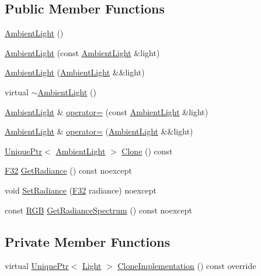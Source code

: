 \subsection*{Public Member Functions}
\begin{DoxyCompactItemize}
\item 
\hyperlink{classmage_1_1_ambient_light_a753dd42af4b6ad15b2f0867a99d6aabe}{Ambient\+Light} ()
\item 
\hyperlink{classmage_1_1_ambient_light_ac5295d1f90e64d3e59ff2856df32a187}{Ambient\+Light} (const \hyperlink{classmage_1_1_ambient_light}{Ambient\+Light} \&light)
\item 
\hyperlink{classmage_1_1_ambient_light_aab4919587032054d28ec15cf5639ad48}{Ambient\+Light} (\hyperlink{classmage_1_1_ambient_light}{Ambient\+Light} \&\&light)
\item 
virtual \hyperlink{classmage_1_1_ambient_light_a511bb794b11f112e750da09f4044e7db}{$\sim$\+Ambient\+Light} ()
\item 
\hyperlink{classmage_1_1_ambient_light}{Ambient\+Light} \& \hyperlink{classmage_1_1_ambient_light_aa8bbeaca08a626b6b5f5447a847724cc}{operator=} (const \hyperlink{classmage_1_1_ambient_light}{Ambient\+Light} \&light)
\item 
\hyperlink{classmage_1_1_ambient_light}{Ambient\+Light} \& \hyperlink{classmage_1_1_ambient_light_ae54bf8695957fb438e162a913725922a}{operator=} (\hyperlink{classmage_1_1_ambient_light}{Ambient\+Light} \&\&light)
\item 
\hyperlink{namespacemage_a3316d7143a973e37adf1110f2e80ca31}{Unique\+Ptr}$<$ \hyperlink{classmage_1_1_ambient_light}{Ambient\+Light} $>$ \hyperlink{classmage_1_1_ambient_light_a542a68882bc0807cf5f9a37391b9f44e}{Clone} () const
\item 
\hyperlink{namespacemage_aa97e833b45f06d60a0a9c4fc22ae02c0}{F32} \hyperlink{classmage_1_1_ambient_light_ab41f72d902f590ebc62ab58427e2bdab}{Get\+Radiance} () const noexcept
\item 
void \hyperlink{classmage_1_1_ambient_light_aac9a833f2261eaa1bf5eaab7608fc878}{Set\+Radiance} (\hyperlink{namespacemage_aa97e833b45f06d60a0a9c4fc22ae02c0}{F32} radiance) noexcept
\item 
const \hyperlink{structmage_1_1_r_g_b}{R\+GB} \hyperlink{classmage_1_1_ambient_light_a5d135eeeef619f13435341eebd3fe476}{Get\+Radiance\+Spectrum} () const noexcept
\end{DoxyCompactItemize}
\subsection*{Private Member Functions}
\begin{DoxyCompactItemize}
\item 
virtual \hyperlink{namespacemage_a3316d7143a973e37adf1110f2e80ca31}{Unique\+Ptr}$<$ \hyperlink{classmage_1_1_light}{Light} $>$ \hyperlink{classmage_1_1_ambient_light_a7223a4770653c20e662810b0956c6e51}{Clone\+Implementation} () const override
\end{DoxyCompactItemize}
